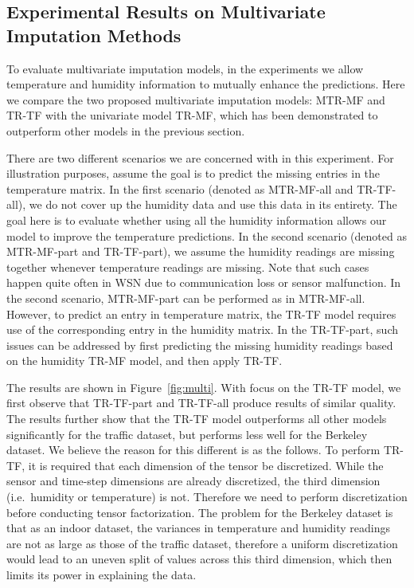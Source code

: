 \subsection{Experimental Results on Multivariate Imputation Methods}




To evaluate multivariate imputation models, in the experiments we allow temperature and humidity information to mutually enhance the predictions.
Here we compare the two proposed multivariate imputation models: MTR-MF and TR-TF with the univariate model TR-MF, which has been demonstrated to outperform other models in the previous section. 

There are two different scenarios we are concerned with in this experiment.
For illustration purposes, assume the goal is to predict the missing entries in the temperature matrix.
In the first scenario (denoted as MTR-MF-all and TR-TF-all), we do not cover up the humidity data and use this data in its entirety.
The goal here is to evaluate whether using all the humidity information allows our model to improve the temperature predictions.
In the second scenario (denoted as MTR-MF-part and TR-TF-part), we assume the humidity readings are missing together whenever temperature readings are missing.
Note that such cases happen quite often in WSN due to communication loss or sensor malfunction.
In the second scenario, MTR-MF-part can be performed as in MTR-MF-all.
However, to predict an entry in temperature matrix, the TR-TF model requires use of the corresponding entry in the humidity matrix.
In the TR-TF-part, such issues can be addressed by first predicting the missing humidity readings based on the humidity TR-MF model, and then apply TR-TF.

The results are shown in Figure~\ref{fig:multi}.
With focus on the TR-TF model, we first observe that TR-TF-part and TR-TF-all produce results of similar quality.
The results further show that the TR-TF model outperforms all other models significantly for the traffic dataset, but performs less well for the Berkeley dataset.
We believe the reason for this different is as the follows.
To perform TR-TF, it is required that each dimension of the tensor be discretized.
While the sensor and time-step dimensions are already discretized, the third dimension (i.e.\ humidity or temperature) is not.
Therefore we need to perform discretization before conducting tensor factorization.
The problem for the Berkeley dataset is that as an indoor dataset, the variances in temperature and humidity readings are not as large as those of the traffic dataset, therefore a uniform discretization would lead to an uneven split of values across this third dimension, which then limits its power in explaining the data.
 
